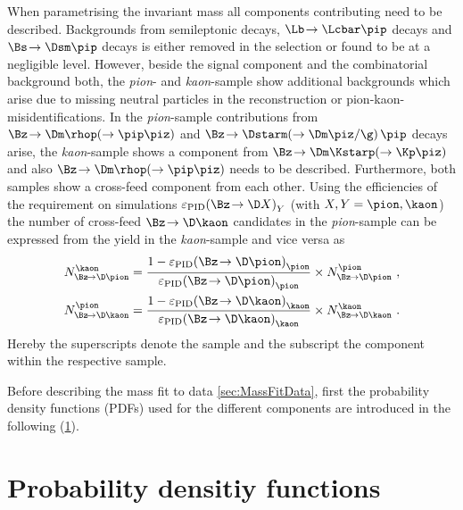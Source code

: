 When parametrising the invariant \Bz mass all components contributing need to be described. Backgrounds from semileptonic decays, $\Lb\!\to\Lcbar\pip$ decays and $\Bs\!\to\Dsm\pip$ decays is either removed in the selection or found to be at a negligible level.
However, beside the signal component and the combinatorial background both, the \emph{pion}- and \emph{kaon}-sample show additional backgrounds which arise due to missing neutral particles in the reconstruction or pion-kaon-misidentifications.
In the \emph{pion}-sample contributions from $\Bz\!\to\Dm\rhop\!\left(\to\pip\piz\right)$ and $\Bz\!\to\Dstarm\!\left(\to\Dm\piz/\g\right)\pip$ decays arise, the \emph{kaon}-sample shows a component from $\Bz\!\to\Dm\Kstarp\!\left(\to\Kp\piz\right)$ and also $\Bz\!\to\Dm\rhop\!\left(\to\pip\piz\right)$  needs to be described.
Furthermore, both samples show a cross-feed component from each other.
Using the efficiencies of the \dllkpi requirement on simulations $\varepsilon_{\text{PID}}\!\left(\Bz\!\to\D X\right)_Y$ (with $X, Y=\pion, \kaon$) the number of cross-feed $\Bz\!\to\D\kaon$ candidates in the \emph{pion}-sample can be expressed from the yield in the \emph{kaon}-sample and vice versa as
\begin{equation}
\begin{aligned}
N_{\Bz\!\to\D\pion}^{\kaon}&=\frac{1-\varepsilon_{\text{PID}}\!\left(\Bz\!\to\D \pion\right)_{\pion}}{\varepsilon_{\text{PID}}\!\left(\Bz\!\to\D \pion\right)_{\pion}}\times N_{\Bz\!\to\D\pion}^{\pion} \,\,,\\
N_{\Bz\!\to\D\kaon}^{\pion}&=\frac{1-\varepsilon_{\text{PID}}\!\left(\Bz\!\to\D \kaon\right)_{\kaon}}{\varepsilon_{\text{PID}}\!\left(\Bz\!\to\D \kaon\right)_{\kaon}}\times N_{\Bz\!\to\D\kaon}^{\kaon}\,\,.\label{eq:ConstrainCrossFeed}
\end{aligned}
\end{equation}
Hereby the superscripts denote the sample and the subscript the component within the respective sample.

Before describing the mass fit to data {\cref{sec:MassFitData}}, first the probability density functions (PDFs) used for the different components are introduced in the following (\cref{sec:PDFs}).

\section{Probability densitiy functions}
\label{sec:PDFs}

